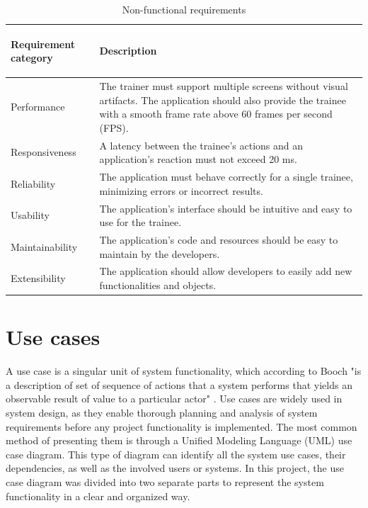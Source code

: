 \begin{table}[!ht]
\caption{Non-functional requirements}
\label{tab:nonFunctionalRequirements}

\small
\begin{tabular}{|p{}|p{}|}
\hline

    \begin{center}
       \textbf{Requirement category}
    \end{center}  
    &
    \begin{center}
        \textbf{Description}
    \end{center}
    \\\hline
    Performance
    & The trainer must support multiple screens without visual artifacts. The application should also provide the trainee with a smooth frame rate above 60 frames per second (FPS).
    \\\hline
    Responsiveness
    & A latency between the trainee's actions and an application's reaction must not exceed 20 ms.
    \\\hline
    Reliability
    & The application must behave correctly for a single trainee, minimizing errors or incorrect results.
    \\\hline
    Usability
    & The application's interface should be intuitive and easy to use for the trainee.
    \\\hline
    Maintainability
    & The application's code and resources should be easy to maintain by the developers.
    \\\hline
    Extensibility
    & The application should allow developers to easily add new functionalities and objects.
    \\\hline
\end{tabular}
\end{table}

\section{Use cases}
A use case is a singular unit of system functionality, which according to Booch "is a description of set of sequence of actions that a system performs that yields an observable result of value to a particular actor" \cite{umlUserGuide}.
Use cases are widely used in system design, as they enable thorough planning and analysis of system requirements before any project functionality is implemented.
The most common method of presenting them is through a Unified Modeling Language (UML) use case diagram.
This type of diagram can identify all the system use cases, their dependencies, as well as the involved users or systems.
In this project, the use case diagram was divided into two separate parts to represent the system functionality in a clear and organized way.
